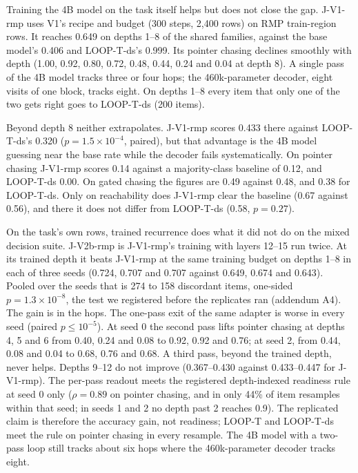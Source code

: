 \documentclass[11pt]{article}
\begin{document}
Training the 4B model on the task itself helps but does not close the gap. J-V1-rmp uses V1's
recipe and budget (300 steps, 2,400 rows) on RMP train-region rows. It reaches 0.649 on
depths 1--8 of the shared families, against the base model's 0.406 and LOOP-T-ds's 0.999. Its
pointer chasing declines smoothly with depth (1.00, 0.92, 0.80, 0.72, 0.48, 0.44, 0.24 and 0.04
at depth 8). A single pass of the 4B model tracks three or four hops; the 460k-parameter decoder,
eight visits of one block, tracks eight. On depths 1--8 every item that only one of the two gets
right goes to LOOP-T-ds (200 items).

Beyond depth 8 neither extrapolates. J-V1-rmp scores 0.433 there against LOOP-T-ds's 0.320
($p=1.5\times10^{-4}$, paired), but that advantage is the 4B model guessing near the base rate
while the decoder fails systematically. On pointer chasing J-V1-rmp scores 0.14 against a
majority-class baseline of 0.12, and LOOP-T-ds 0.00. On gated chasing the figures are 0.49
against 0.48, and 0.38 for LOOP-T-ds. Only on reachability does J-V1-rmp clear the baseline
(0.67 against 0.56), and there it does not differ from LOOP-T-ds (0.58, $p=0.27$).

On the task's own rows, trained recurrence does what it did not do on the mixed decision suite.
J-V2b-rmp is J-V1-rmp's training with layers 12--15 run twice. At its trained depth it beats
J-V1-rmp at the same training budget on depths 1--8 in each of three seeds (0.724, 0.707 and 0.707
against 0.649, 0.674 and 0.643). Pooled over the seeds that is 274 to 158 discordant items,
one-sided $p=1.3\times10^{-8}$, the test we registered before the replicates ran (addendum A4).
The gain is in the hops. The one-pass exit of the same adapter is worse in every seed (paired
$p\le10^{-5}$). At seed 0 the second pass lifts pointer chasing at depths 4, 5 and 6 from 0.40,
0.24 and 0.08 to 0.92, 0.92 and 0.76; at seed 2, from 0.44, 0.08 and 0.04 to 0.68, 0.76 and 0.68.
A third pass, beyond the trained depth, never helps. Depths 9--12 do not improve (0.367--0.430
against 0.433--0.447 for J-V1-rmp). The per-pass readout meets the registered depth-indexed
readiness rule at seed 0 only ($\rho=0.89$ on pointer chasing, and in only 44\% of item
resamples within that seed; in seeds 1 and 2 no depth past 2 reaches 0.9). The replicated claim
is therefore the accuracy gain, not readiness; LOOP-T and LOOP-T-ds meet the rule on pointer
chasing in every resample. The 4B model with a
two-pass loop still tracks about six hops where the 460k-parameter decoder tracks eight.
\end{document}
